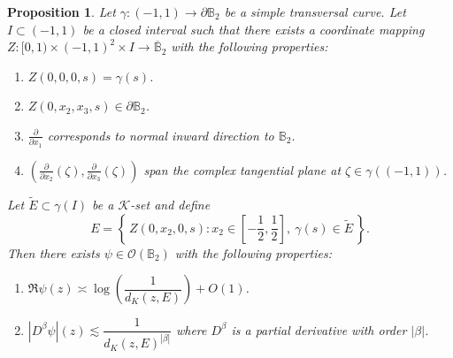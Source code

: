 \documentclass[a4paper,12pt]{amsart}
\newtheorem{prop}[thm]{Proposition}
\theoremstyle{definition}
\theoremstyle{remark}
\def\B{\mathbb{B}}
\begin{document}
        \begin{prop} \label{MainTool3}
            Let $\gamma : (-1,1) \rightarrow \partial \B_2$ be a simple transversal curve. Let $I \subset (-1,1)$ be a closed interval such that there exists a coordinate mapping $Z : [0,1) \times (-1,1)^2 \times I \rightarrow \overline{\B}_2$ with the following properties:
            \begin{enumerate}
                \item $Z (0,0,0,s) = \gamma(s)$.
                \item $Z(0,x_2,x_3,s) \in \partial \B_2$.
                \item $\frac{\partial}{\partial x_1}$ corresponds to normal inward direction to $\B_2$. 
                \item $(\frac{\partial}{\partial x_2} (\zeta),\frac{\partial}{\partial x_3} (\zeta))$ span the complex tangential plane at $\zeta \in \gamma((-1,1))$.
            \end{enumerate}
            Let $\tilde{E} \subset \gamma(I)$ be a $\mathcal{K}$-set and define
            \begin{equation} \label{eq: mainthm3 set creation}
                E = \left\{\, Z(0,x_2,0,s) : x_2 \in [-\frac{1}{2},\frac{1}{2}],\ \gamma(s) \in \tilde{E} \,\right\}.
            \end{equation}
            Then there exists $\psi \in \mathcal{O}(\B_2)$ with the following properties:
            \begin{enumerate}
                \item $\Re \psi (z) \asymp \log(\dfrac{1}{d_K(z,E)}) + O(1)$.
                \item $\left| D^{\beta} \psi \right|(z) \lesssim \dfrac{1}{d_K(z,E)^{|\beta|}}$ where $D^{\beta}$ is a partial derivative with order $|\beta|$.
            \end{enumerate}
        \end{prop}
\end{document}
